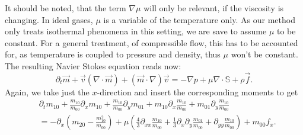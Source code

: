 It should be noted, that the term $\nabla \mu$ will only be relevant, if the viscosity is changing.
In ideal gases, $\mu$ is a variable of the temperature only.
As our method only treats isothermal phenomena in this setting, we are save to assume $\mu$ to be constant.
For a general treatment, of compressible flow, this has to be accounted for, as temperature is coupled to pressure and density, thus $\mu$ won't be constant.
The resulting Navier Stokes equation reads now:
\begin{equation}
  \label{eq:compressible NS isotherm}
  \partial_t \vec{m} + \vec{v}(\nabla \cdot \vec{m}) + (\vec{m} \cdot \nabla)\vec{v}
    = - \nabla p + \mu \nabla \cdot \mathbb{S} + \rho \vec{f}.
\end{equation}
Again, we take just the $x$-direction and insert the corresponding moments to get
\begin{equation}
  \begin{aligned}
    & \partial_t m_{10}
    + \frac{m_{10}}{m_{00}} \partial_x m_{10}
    + \frac{m_{10}}{m_{00}}\partial_y m_{01}
    + m_{10} \partial_x \frac{m_{10}}{m_{00}}
    + m_{01} \partial_y \frac{m_{10}}{m_{00}}
     \\
    & =
    - \partial_x \left(m_{20} - \frac{ m_{10}^2 }{ m_{00} } \right)
     + \mu \left(\frac{4}{3}\partial_{xx}\frac{m_{10}}{m_{00}}
            + \frac{1}{3}\partial_x\partial_y \frac{m_{01}}{m_{00}}
            + \partial_{yy} \frac{m_{10}}{m_{00}} \right) + m_{00}f_x.
  \end{aligned}
\end{equation}
